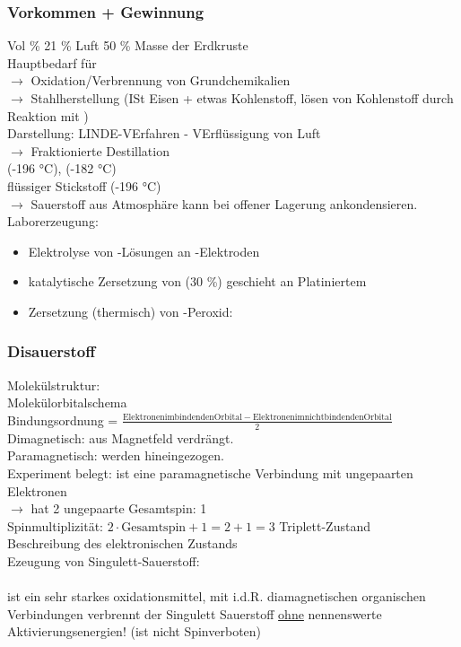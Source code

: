 \documentclass{article}
\begin{document}
\subsubsection{Vorkommen + Gewinnung}
Vol \% 21 \% Luft 50 \% Masse der Erdkruste\\
Hauptbedarf für \\
$\rightarrow$ Oxidation/Verbrennung von Grundchemikalien\\
$\rightarrow$ Stahlherstellung (ISt Eisen + etwas Kohlenstoff, lösen von Kohlenstoff durch Reaktion mit )\\
Darstellung: LINDE-VErfahren - VErflüssigung von Luft\\
$\rightarrow$ Fraktionierte Destillation\\
 (-196 °C),  (-182 °C)\\
flüssiger Stickstoff (-196 °C)\\
$\rightarrow$ Sauerstoff aus Atmosphäre kann bei offener Lagerung ankondensieren.\\
Laborerzeugung:\\
\begin{itemize}
    \item Elektrolyse von -Lösungen an -Elektroden\\
    \item katalytische Zersetzung von (30 \%) geschieht an Platiniertem \\
    \item Zersetzung (thermisch) von -Peroxid: \\
\end{itemize}
\subsubsection{Disauerstoff }
Molekülstruktur: \\
Molekülorbitalschema\\
Bindungsordnung = $\frac{\mathrm{Elektronen im bindenden Orbital} - \mathrm{Elektronen im nichtbindenden Orbital}}{2}$\\
Dimagnetisch: aus Magnetfeld verdrängt.\\
Paramagnetisch: werden hineingezogen.\\
Experiment belegt:  ist eine paramagnetische Verbindung mit ungepaarten Elektronen\\
$\rightarrow$  hat 2 ungepaarte  Gesamtspin: 1\\
Spinmultiplizität: $2\cdot \mathrm{Gesamtspin} + 1 = 2 + 1 = 3$ Triplett-Zustand\\
Beschreibung des elektronischen Zustands\\
Ezeugung von Singulett-Sauerstoff:\\
\\
 ist ein sehr starkes oxidationsmittel, mit i.d.R. diamagnetischen organischen Verbindungen verbrennt der Singulett Sauerstoff \underline{ohne} nennenswerte Aktivierungsenergien! (ist  nicht Spinverboten)
\end{document}
